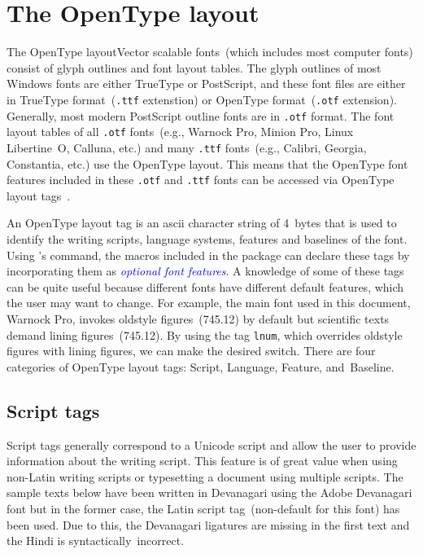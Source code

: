 {{\section{The OpenType layout}{The OpenType layout}Vector scalable fonts~(which includes most computer fonts) consist of glyph outlines and font layout tables. The glyph outlines of most Windows fonts are either TrueType or PostScript, and these font files are either in TrueType format~({\tt .ttf} extenstion) or OpenType format~({\tt .otf} extension). Generally, most modern PostScript outline fonts are in {\tt .otf} format. The font layout tables of all {\tt .otf} fonts~(e.g., Warnock Pro, Minion Pro, Linux Libertine~O, Calluna, etc.) and many {\tt .ttf} fonts~(e.g., Calibri, Georgia, Constantia, etc.) use the OpenType layout. This means that the OpenType font features included in these {\tt .otf} and {\tt .ttf} fonts can be accessed via OpenType layout tags~\cite{opentype_tag_registry}.

An OpenType layout tag is an {\caps ascii} character string of 4~bytes that is used to identify the writing scripts, language systems, features and baselines of the font. Using \capsxetex's  command, the macros included in the package  can declare these tags by incorporating them as \textcolor{blue}{\sl optional font features}. A knowledge of some of these tags can be quite useful because different fonts have different default features, which the user may want to change. For example, the main font used in this document, Warnock Pro, invokes oldstyle figures~(745.12) by default but scientific texts demand lining figures~({745.12}). By using the tag {\tt lnum}, which overrides oldstyle figures with lining figures, we can make the desired switch. There are four categories of OpenType layout tags: Script, Language, Feature, and~Baseline.

\subsection{Script tags}Script tags generally correspond to a Unicode script and allow the user to provide information about the writing script. This feature is of great value when using non-Latin writing scripts or typesetting a document using multiple scripts. The sample texts below have been written in Devanagari using the Adobe Devanagari font but in the former case, the Latin script tag~(non-default for this font) has been used. Due to this, the Devanagari ligatures are missing in the first text and the Hindi is syntactically~incorrect.

}}
